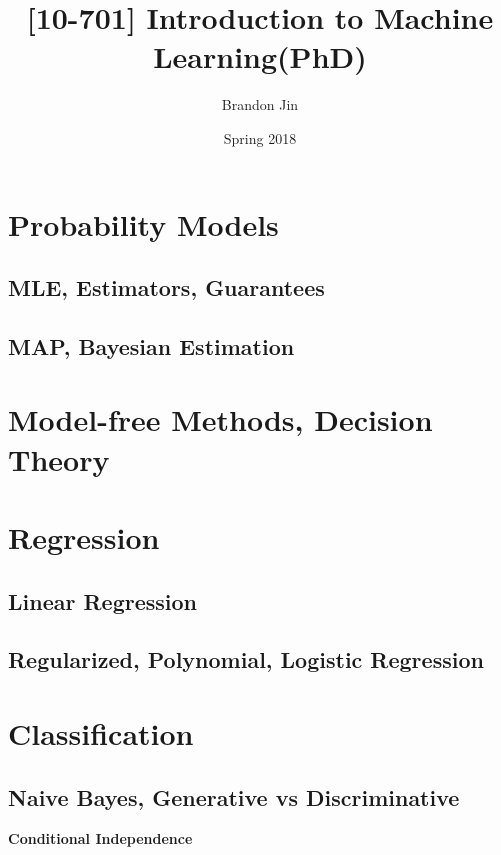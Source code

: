 \documentclass{article}
\title{[10-701] Introduction to Machine Learning(PhD)}
\date{Spring 2018}
\author{Brandon Jin}
\begin{document}
\maketitle
{}
\newpage
{}








\tableofcontents
\thispagestyle{empty}
\cleardoublepage
\setcounter{page}{1}


\section{Probability Models}
\subsection{MLE, Estimators, Guarantees}
\subsection{MAP, Bayesian Estimation}

\section{Model-free Methods, Decision Theory}

\section{Regression}
\subsection{Linear Regression}
\subsection{Regularized, Polynomial, Logistic Regression}

\section{Classification}
\subsection{Naive Bayes, Generative vs Discriminative}
\textbf{Conditional Independence}
\end{document}
